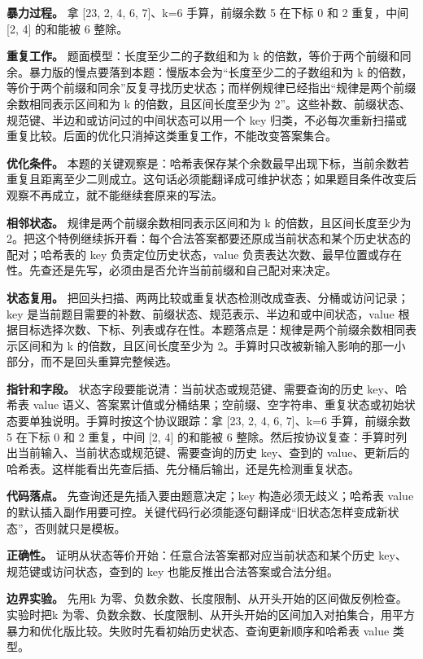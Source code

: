 \textbf{暴力过程。} 拿 [23, 2, 4, 6, 7]、k=6 手算，前缀余数 5 在下标 0 和 2 重复，中间 [2, 4] 的和能被 6 整除。

\textbf{重复工作。} 题面模型：长度至少二的子数组和为 k 的倍数，等价于两个前缀和同余。暴力版的慢点要落到本题：慢版本会为“长度至少二的子数组和为 k 的倍数，等价于两个前缀和同余”反复寻找历史状态；而样例规律已经指出“规律是两个前缀余数相同表示区间和为 k 的倍数，且区间长度至少为 2”。这些补数、前缀状态、规范键、半边和或访问过的中间状态可以用一个 key 归类，不必每次重新扫描或重复比较。后面的优化只消掉这类重复工作，不能改变答案集合。

\textbf{优化条件。} 本题的关键观察是：哈希表保存某个余数最早出现下标，当前余数若重复且距离至少二则成立。这句话必须能翻译成可维护状态；如果题目条件改变后观察不再成立，就不能继续套原来的写法。

\textbf{相邻状态。} 规律是两个前缀余数相同表示区间和为 k 的倍数，且区间长度至少为 2。把这个特例继续拆开看：每个合法答案都要还原成当前状态和某个历史状态的配对；哈希表的 key 负责定位历史状态，value 负责表达次数、最早位置或存在性。先查还是先写，必须由是否允许当前前缀和自己配对来决定。

\textbf{状态复用。} 把回头扫描、两两比较或重复状态检测改成查表、分桶或访问记录；key 是当前题目需要的补数、前缀状态、规范表示、半边和或中间状态，value 根据目标选择次数、下标、列表或存在性。本题落点是：规律是两个前缀余数相同表示区间和为 k 的倍数，且区间长度至少为 2。手算时只改被新输入影响的那一小部分，而不是回头重算完整候选。

\textbf{指针和字段。} 状态字段要能说清：当前状态或规范键、需要查询的历史 key、哈希表 value 语义、答案累计值或分桶结果；空前缀、空字符串、重复状态或初始状态要单独说明。手算时按这个协议跟踪：拿 [23, 2, 4, 6, 7]、k=6 手算，前缀余数 5 在下标 0 和 2 重复，中间 [2, 4] 的和能被 6 整除。然后按协议复查：手算时列出当前输入、当前状态或规范键、需要查询的历史 key、查到的 value、更新后的哈希表。这样能看出先查后插、先分桶后输出，还是先检测重复状态。

\textbf{代码落点。} 先查询还是先插入要由题意决定；key 构造必须无歧义；哈希表 value 的默认插入副作用要可控。关键代码行必须能逐句翻译成“旧状态怎样变成新状态”，否则就只是模板。

\textbf{正确性。} 证明从状态等价开始：任意合法答案都对应当前状态和某个历史 key、规范键或访问状态，查到的 key 也能反推出合法答案或合法分组。

\textbf{边界实验。} 先用k 为零、负数余数、长度限制、从开头开始的区间做反例检查。实验时把k 为零、负数余数、长度限制、从开头开始的区间加入对拍集合，用平方暴力和优化版比较。失败时先看初始历史状态、查询更新顺序和哈希表 value 类型。

